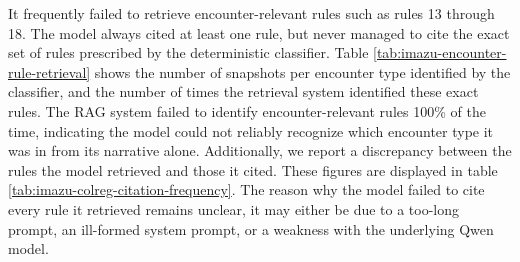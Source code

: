 \documentclass[10pt]{reportMaster}
\begin{document}
It frequently failed to retrieve encounter-relevant rules such as rules 13 through 18. The model always cited at least one rule, but never managed to cite the exact set of rules prescribed by the deterministic classifier. Table \ref{tab:imazu-encounter-rule-retrieval} shows the number of snapshots per encounter type identified by the classifier, and the number of times the retrieval system identified these exact rules. The RAG system failed to identify encounter-relevant rules 100\% of the time, indicating the model could not reliably recognize which encounter type it was in from its narrative alone. Additionally, we report a discrepancy between the rules the model retrieved and those it cited. These figures are displayed in table \ref{tab:imazu-colreg-citation-frequency}. The reason why the model failed to cite every rule it retrieved remains unclear, it may either be due to a too-long prompt, an ill-formed system prompt, or a weakness with the underlying Qwen model. 
\end{document}
